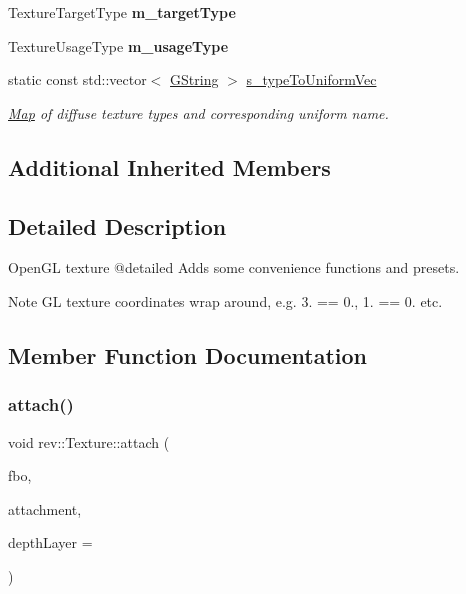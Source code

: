 \begin{DoxyCompactItemize}
Texture\+Target\+Type {\bfseries m\+\_\+target\+Type}
\item 
\mbox{\label{classrev_1_1_texture_a391d1ef43d440caf005b35b1a23b49d9}} 
Texture\+Usage\+Type {\bfseries m\+\_\+usage\+Type}
\item 
static const std\+::vector$<$ \mbox{\hyperlink{classrev_1_1_g_string}{G\+String}} $>$ \mbox{\hyperlink{classrev_1_1_texture_ac8561b11a04ffd525b10a48f46beb6e2}{s\+\_\+type\+To\+Uniform\+Vec}}
\begin{DoxyCompactList}\small\item\em \mbox{\hyperlink{classrev_1_1_map}{Map}} of diffuse texture types and corresponding uniform name. \end{DoxyCompactList}\end{DoxyCompactItemize}
\subsection*{Additional Inherited Members}


\subsection{Detailed Description}
Open\+GL texture @detailed Adds some convenience functions and presets. 

\begin{DoxyNote}{Note}
GL texture coordinates wrap around, e.\+g. 3. == 0., 1. == 0. etc. 
\end{DoxyNote}


\subsection{Member Function Documentation}
\mbox{\label{classrev_1_1_texture_a30f599dafc75209703110b96792f6842}} 
\subsubsection{\texorpdfstring{attach()}{attach()}}
{\footnotesize\ttfamily void rev\+::\+Texture\+::attach (\begin{DoxyParamCaption}\item[{\mbox{\hyperlink{classrev_1_1_frame_buffer}{Frame\+Buffer}} \&}]{fbo,  }\item[{int}]{attachment,  }\item[{uint32\+\_\+t}]{depth\+Layer = {} }\end{DoxyParamCaption})}



